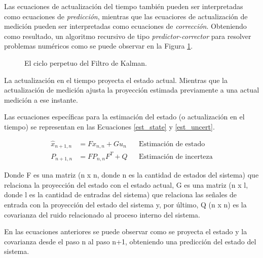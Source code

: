 \noindent Las ecuaciones de actualizaci\'on del tiempo tambi\'en pueden ser 
interpretadas como ecuaciones de \emph{predicci\'on}, mientras que las 
ecuaciores de actualizaci\'on de medici\'on pueden ser interpretadas como 
ecuaciones de \emph{correcci\'on}. Obteniendo como resultado, un algoritmo 
recursivo de tipo \emph{predictor-corrector} para resolver problemas num\'ericos 
como se puede observar en la Figura \ref{kalman_filter_sch}.

\begin{figure}[h!]
    \begin{center}
    \caption{El ciclo perpetuo del Filtro de Kalman. }
    \label{kalman_filter_sch}
    \end{center}
\end{figure}
\FloatBarrier

La actualizaci\'on en el tiempo proyecta el estado actual. Mientras que la
actualizaci\'on de medici\'on ajusta la proyecci\'on estimada previamente a una
actual medici\'on a ese instante.

Las ecuaciones específicas para la estimaci\'on del estado (o actualizaci\'on en
el tiempo) se representan en las Ecuaciones \ref{est_state} y \ref{est_uncert}.

\begin{align}
    \hat{x}_{n+1, n} &= F\hat{x}_{n,n} + Gu_n & & \textrm{Estimaci\'on de estado}
    \label{est_state} \\
    P_{n+1,n} &= FP_{n,n}F^T + Q & & \textrm{Estimaci\'on de incerteza}
    \label{est_uncert}
\end{align}

\noindent Donde F es una matriz (n x n, donde n es la cantidad de estados del 
sistema) que relaciona la proyecci\'on del estado con el estado actual, G es una 
matriz (n x l, donde l es la cantidad de entradas del sistema) que relaciona las 
señales de entrada con la proyecci\'on del estado del sistema y, por \'ultimo, 
Q (n x n) es la covarianza del ruido relacionado al proceso interno del sistema.

\noindent En las ecuaciones anteriores se puede observar como se proyecta el 
estado y la covarianza desde el paso n al paso n+1, obteniendo una predicci\'on 
del estado del sistema.

